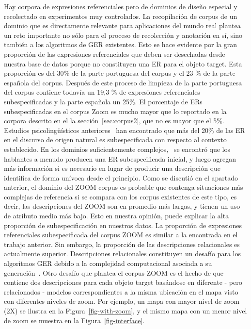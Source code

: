 Hay corpora de expresiones referenciales pero de dominios de dise\~no especial y recolectado en experimentos muy controlados. La recopilaci\'on de corpus de un dominio que es directamente relevante para aplicaciones del mundo real plantea un reto importante no s\'olo para el proceso de recolecci\'on y anotaci\'on en s\'{i}, sino tambi\'en a los algoritmos de GER existentes. Esto se hace evidente por la gran proporci\'on de las expresiones referenciales que deben ser desechadas desde nuestra base de datos porque no constituyen una ER para el objeto target. Esta proporci\'on es del 30\% de la parte portuguesa del corpus y el 23 \% de la parte espa\~nola del corpus.
Despu\'es de este proceso de limpieza de la parte portuguesa del corpus contiene todav\'{i}a un 19,3 \% de expresiones referenciales subespecificadas y la parte espa\~nola un 25\%. El porcentaje de ERs subespecificadas en el corpus Zoom es mucho mayor que lo reportado en la corpora descrito en el la secci\'on~\ref{sec:corpus2}, que no es mayor que el 5\%. Estudios psicoling\"u\'{i}sticos anteriores~\cite{Clark1986} han encontrado que m\'as del 20\% de las ER en el discurso de origen natural es subespecificada con respecto al contexto establecido. En los dominios suficientemente complejos,~\cite{Clark1986} se encontr\'o que los hablantes a menudo producen una ER subespecificada inicial, y luego agregan m\'as informaci\'on si es necesario en lugar de producir una descripci\'on que identifica de forma un\'{i}voca desde el principio. Como se discuti\'o en el apartado anterior, el dominio del ZOOM corpus es probable que contenga situaciones m\'as complejas de referencia si se compara con los corpus existentes de este tipo, es decir, las descripciones del ZOOM son en promedio m\'as largas, y tienen un uso de atributo medio m\'as bajo. Esto en nuestra opini\'on, puede explicar la alta proporci\'on de subespecificaci\'on en nuestros datos.
La proporci\'on de expresiones referenciales subespecificada del corpus ZOOM es similar a la encontrada en el trabajo anterior. Sin embargo, la proporci\'on de las descripciones relacionales es actualmente superior. Descripciones relacionales constituyen un desaf\'{i}o para los algoritmos GER debido a la complejidad computacional asociada a su generaci\'on~\cite{survey}. Otro desaf\'{i}o que plantea el corpus ZOOM es el hecho de que contiene dos descripciones para cada objeto target bas\'andose en diferente - pero relacionados - modelos correspondientes a la misma ubicaci\'on en el mapa visto con diferentes niveles de zoom. Por ejemplo, un mapa con mayor nivel de zoom (2X) se ilustra en la Figura~\ref{fig-with-zoom}, y el mismo mapa con un menor nivel de zoom se muestra en la Figura~\ref{fig-interface}.


